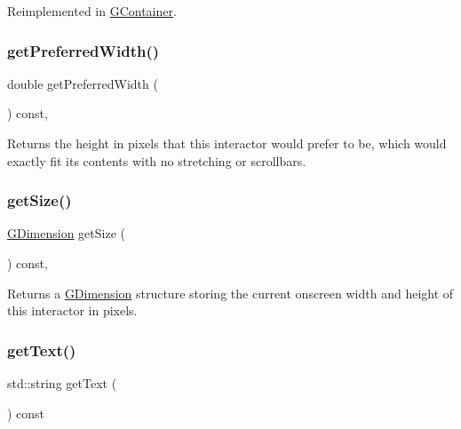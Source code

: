 Reimplemented in \mbox{\hyperlink{classGContainer_a21904b305edacd8f871d6951cb8d3fa5}{G\+Container}}.

\mbox{\label{classGInteractor_a82bca31d37700fb0e35d2743352efd5e}} 
\subsubsection{\texorpdfstring{get\+Preferred\+Width()}{getPreferredWidth()}}
{\footnotesize\ttfamily double get\+Preferred\+Width (\begin{DoxyParamCaption}{ }\end{DoxyParamCaption}) const\hspace{0.3cm}{\ttfamily [virtual]}, {\ttfamily [inherited]}}



Returns the height in pixels that this interactor would prefer to be, which would exactly fit its contents with no stretching or scrollbars. 

\mbox{\label{classGInteractor_a7b4eec96a2bdc6420695d5796a78eea9}} 
\subsubsection{\texorpdfstring{get\+Size()}{getSize()}}
{\footnotesize\ttfamily \mbox{\hyperlink{classGDimension}{G\+Dimension}} get\+Size (\begin{DoxyParamCaption}{ }\end{DoxyParamCaption}) const\hspace{0.3cm}{\ttfamily [virtual]}, {\ttfamily [inherited]}}



Returns a \mbox{\hyperlink{classGDimension}{G\+Dimension}} structure storing the current onscreen width and height of this interactor in pixels. 

\mbox{\label{classGTextField_aff553c50924b836c29f146ed34a7c6ec}} 
\subsubsection{\texorpdfstring{get\+Text()}{getText()}}
{\footnotesize\ttfamily std\+::string get\+Text (\begin{DoxyParamCaption}{ }\end{DoxyParamCaption}) const\hspace{0.3cm}{\ttfamily [virtual]}}



